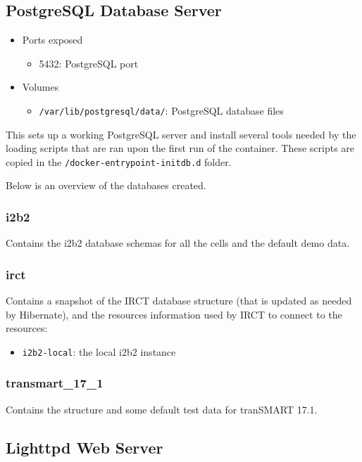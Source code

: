 \subsection{PostgreSQL Database Server}

\begin{itemize}
    \item Ports exposed
        \begin{itemize}
        \item 5432: PostgreSQL port
        \end{itemize}
        
    \item Volumes
        \begin{itemize}
        \item \verb|/var/lib/postgresql/data/|: PostgreSQL database files
        \end{itemize}
\end{itemize}

This sets up a working PostgreSQL server and install several tools needed by the loading scripts that are ran upon the first run of the container.
These scripts are copied in the \verb|/docker-entrypoint-initdb.d| folder.

Below is an overview of the databases created.

\subsubsection{i2b2}
Contains the i2b2 database schemas for all the cells and the default demo data.

\subsubsection{irct}
Contains a snapshot of the IRCT database structure (that is updated as needed by Hibernate), and the resources information used by IRCT to connect to the resources:

\begin{itemize}
    \item \verb|i2b2-local|: the local i2b2 instance
\end{itemize}

\subsubsection{transmart\_17\_1}
Contains the structure and some default test data for tranSMART 17.1.
    
\subsection{Lighttpd Web Server}


